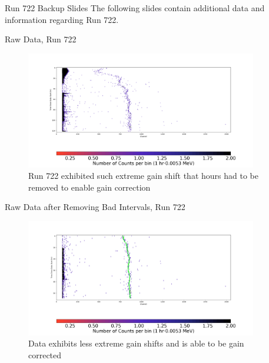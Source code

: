 \documentclass[aspectratio=169]{beamer}
\begin{document}
\begin{frame}{Run 722 Backup Slides}
\label{722_Backup}
    The following slides contain additional data and information regarding Run 722.
\end{frame}

\begin{frame}{Raw Data, Run 722}
    \begin{figure}
        \begin{center}
            \includegraphics[width=0.9\textwidth]
            {assets/722/RD.png}
            \caption{Run 722 exhibited such extreme gain shift that hours had to be removed to enable gain correction}
        \end{center}
    \end{figure}
\end{frame}

\begin{frame}{Raw Data after Removing Bad Intervals, Run 722}
    \begin{figure}
        \begin{center}
            \includegraphics[width=0.9\textwidth]
            {assets/722/RDP.png}
            \caption{Data exhibits less extreme gain shifts and is able to be gain corrected}
        \end{center}
    \end{figure}
\end{frame}
\end{document}
